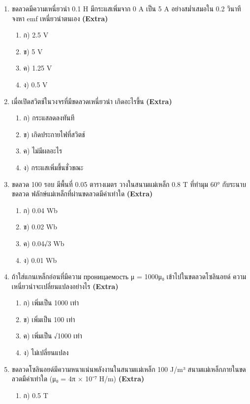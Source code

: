 \documentclass[12pt]{article}
\begin{document}
\begin{enumerate}[label=\arabic*.]
\begin{enumerate}[label=)]
\item ง) 9.87 × 10⁻⁴ H
\end{enumerate}
\item ขดลวดมีความเหนี่ยวนำ 0.1 H มีกระแสเพิ่มจาก 0 A เป็น 5 A อย่างสม่ำเสมอใน 0.2 วินาที จงหา emf เหนี่ยวนำตนเอง \hfill \textbf{\small (Extra)}
\begin{enumerate}[label=)]
\item ก) 2.5 V
\item ข) 5 V
\item ค) 1.25 V
\item ง) 0.5 V
\end{enumerate}
\item เมื่อเปิดสวิตช์ในวงจรที่มีขดลวดเหนี่ยวนำ เกิดอะไรขึ้น \hfill \textbf{\small (Extra)}
\begin{enumerate}[label=)]
\item ก) กระแสลดลงทันที
\item ข) เกิดประกายไฟที่สวิตช์
\item ค) ไม่มีผลอะไร
\item ง) กระแสเพิ่มขึ้นชั่วขณะ
\end{enumerate}
\item ขดลวด 100 รอบ มีพื้นที่ 0.05 ตารางเมตร วางในสนามแม่เหล็ก 0.8 T ที่ทำมุม 60° กับระนาบขดลวด ฟลักษ์แม่เหล็กที่ผ่านขดลวดมีค่าเท่าใด \hfill \textbf{\small (Extra)}
\begin{enumerate}[label=)]
\item ก) 0.04 Wb
\item ข) 0.02 Wb
\item ค) 0.04√3 Wb
\item ง) 0.01 Wb
\end{enumerate}
\item ถ้าใส่แกนเหล็กอ่อนที่มีความ проницаемость μ = 1000μ₀ เข้าไปในขดลวดโซลินอยด์ ความเหนี่ยวนำจะเปลี่ยนแปลงอย่างไร \hfill \textbf{\small (Extra)}
\begin{enumerate}[label=)]
\item ก) เพิ่มเป็น 1000 เท่า
\item ข) เพิ่มเป็น 100 เท่า
\item ค) เพิ่มเป็น √1000 เท่า
\item ง) ไม่เปลี่ยนแปลง
\end{enumerate}
\item ขดลวดโซลินอยด์มีความหนาแน่นพลังงานในสนามแม่เหล็ก 100 J/m³ สนามแม่เหล็กภายในขดลวดมีค่าเท่าใด (μ₀ = 4π × 10⁻⁷ H/m) \hfill \textbf{\small (Extra)}
\begin{enumerate}[label=)]
\item ก) 0.5 T

\end{enumerate}
\end{enumerate}
\end{document}
